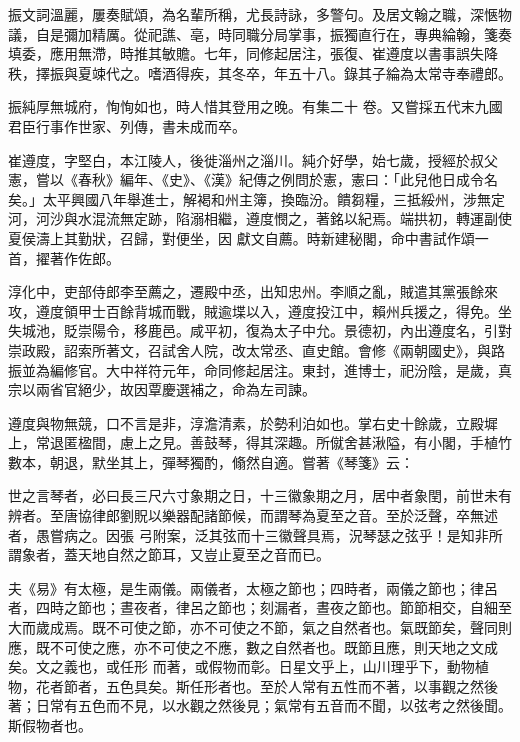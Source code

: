 \begin{pinyinscope}
 振文詞溫麗，屢奏賦頌，為名輩所稱，尤長詩詠，多警句。及居文翰之職，深愜物議，自是彌加精厲。從祀譙、亳，時同職分局掌事，振獨直行在，專典綸翰，箋奏填委，應用無滯，時推其敏贍。七年，同修起居注，張復、崔遵度以書事誤失降秩，擇振與夏竦代之。嗜酒得疾，其冬卒，年五十八。錄其子綸為太常寺奉禮郎。



 振純厚無城府，恂恂如也，時人惜其登用之晚。有集二十
 卷。又嘗採五代末九國君臣行事作世家、列傳，書未成而卒。



 崔遵度，字堅白，本江陵人，後徙淄州之淄川。純介好學，始七歲，授經於叔父憲，嘗以《春秋》編年、《史》、《漢》紀傳之例問於憲，憲曰：「此兒他日成令名矣。」太平興國八年舉進士，解褐和州主簿，換臨汾。饋芻糧，三抵綏州，涉無定河，河沙與水混流無定跡，陷溺相繼，遵度憫之，著銘以紀焉。端拱初，轉運副使夏侯濤上其勤狀，召歸，對便坐，因
 獻文自薦。時新建秘閣，命中書試作頌一首，擢著作佐郎。



 淳化中，吏部侍郎李至薦之，遷殿中丞，出知忠州。李順之亂，賊遣其黨張餘來攻，遵度領甲士百餘背城而戰，賊逾堞以入，遵度投江中，賴州兵援之，得免。坐失城池，貶崇陽令，移鹿邑。咸平初，復為太子中允。景德初，內出遵度名，引對崇政殿，詔索所著文，召試舍人院，改太常丞、直史館。會修《兩朝國史》，與路振並為編修官。大中祥符元年，命同修起居注。東封，進博士，祀汾陰，是歲，真
 宗以兩省官絕少，故因覃慶選補之，命為左司諫。



 遵度與物無競，口不言是非，淳澹清素，於勢利泊如也。掌右史十餘歲，立殿墀上，常退匿楹間，慮上之見。善鼓琴，得其深趣。所僦舍甚湫隘，有小閣，手植竹數本，朝退，默坐其上，彈琴獨酌，翛然自適。嘗著《琴箋》云：



 世之言琴者，必曰長三尺六寸象期之日，十三徽象期之月，居中者象閏，前世未有辨者。至唐協律郎劉貺以樂器配諸節候，而謂琴為夏至之音。至於泛聲，卒無述者，愚嘗病之。因張
 弓附案，泛其弦而十三徽聲具焉，況琴瑟之弦乎！是知非所謂象者，蓋天地自然之節耳，又豈止夏至之音而已。



 夫《易》有太極，是生兩儀。兩儀者，太極之節也；四時者，兩儀之節也；律呂者，四時之節也；晝夜者，律呂之節也；刻漏者，晝夜之節也。節節相交，自細至大而歲成焉。既不可使之節，亦不可使之不節，氣之自然者也。氣既節矣，聲同則應，既不可使之應，亦不可使之不應，數之自然者也。既節且應，則天地之文成矣。文之義也，或任形
 而著，或假物而彰。日星文乎上，山川理乎下，動物植物，花者節者，五色具矣。斯任形者也。至於人常有五性而不著，以事觀之然後著；日常有五色而不見，以水觀之然後見；氣常有五音而不聞，以弦考之然後聞。斯假物者也。




\end{pinyinscope}
